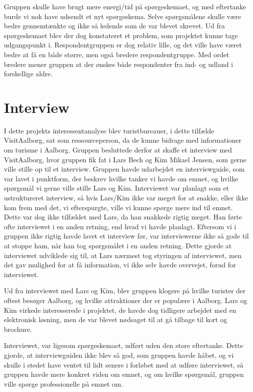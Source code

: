 Gruppen skulle have brugt mere energi/tid på spørgeskemaet, og med eftertanke burde vi nok have udsendt et nyt spørgeskema. Selve spørgsmålene skulle være bedre gennemtænkte og ikke så ledende som de var blevet skrevet. Ud fra spørgeskemaet blev der dog konstateret et problem, som projektet kunne tage udgangspunkt i. Respondentgruppen er dog relativ lille, og det ville have været bedre at få en både større, men også bredere respondentgruppe. Med ordet bredere mener gruppen at der ønskes både respondenter fra ind- og udland i forskellige aldre.

\section{Interview}
I dette projekts interessentanalyse blev turistbureauer, i dette tilfælde VisitAalborg, sat som ressourceperson, da de kunne bidrage med informationer om turisme i Aalborg. Gruppen besluttede derfor at skaffe et interview med VisitAalborg, hvor gruppen fik fat i Lars Bech og Kim Mikael Jensen, som gerne ville stille op til et interview. \newline
Gruppen havde udarbejdet en interviewguide, som var lavet i punktform, der beskrev hvilke tanker vi havde om emnet, og hvilke spørgsmål vi gerne ville stille Lars og Kim. Interviewet var planlagt som et ustruktureret interview, så hvis Lars/Kim ikke var meget for at snakke, eller ikke kom frem med det, vi efterspurgte, ville vi kunne spørge mere ind til emnet. Dette var dog ikke tilfældet med Lars, da han snakkede rigtig meget. Han førte ofte interviewet i en anden retning, end hvad vi havde planlagt. Eftersom vi i gruppen ikke rigtig havde lavet et interview før, var interviewerne ikke så gode til at stoppe ham, når han tog spørgsmålet i en anden retning. Dette gjorde at interviewet udviklede sig til, at Lars nærmest tog styringen af interviewet, men det gav mulighed for at få information, vi ikke selv havde overvejet, forud for interviewet.

Ud fra interviewet med Lars og Kim, blev gruppen klogere på hvilke turister der oftest besøger Aalborg, og hvilke attraktioner der er populære i Aalborg. Lars og Kim virkede interesserede i projektet, de havde dog tidligere arbejdet med en elektronisk løsning, men de var blevet nødsaget til at gå tilbage til kort og brochure. 

Interviewet, var ligesom spørgeskemaet, udført uden den store eftertanke. Dette gjorde, at interviewguiden ikke blev så god, som gruppen havde håbet, og vi skulle i stedet have ventet til lidt senere i forløbet med at udføre interviewet, så gruppen havde mere konkret viden om emnet, og om hvilke spørgsmål, gruppen ville spørge professionelle på emnet om. 

